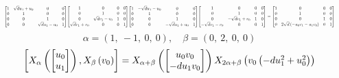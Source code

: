 \documentclass[11pt]{article}
\theoremstyle{definition}
\begin{document}
\[
\scaletoalign{\textwidth}{{\left[\begin{matrix}1 & \sqrt{d} u_{1} + u_{0} & 0 & 0\\0 & 1 & 0 & 0\\0 & 0 & 1 & 0\\0 & 0 & \sqrt{d} u_{1} - u_{0} & 1\end{matrix}\right]} {\left[\begin{matrix}1 & 0 & 0 & 0\\0 & 1 & 0 & 0\\0 & \sqrt{d} v_{1} - v_{0} & 1 & 0\\\sqrt{d} v_{1} + v_{0} & 0 & 0 & 1\end{matrix}\right]} {\left[\begin{matrix}1 & - \sqrt{d} u_{1} - u_{0} & 0 & 0\\0 & 1 & 0 & 0\\0 & 0 & 1 & 0\\0 & 0 & - \sqrt{d} u_{1} + u_{0} & 1\end{matrix}\right]} {\left[\begin{matrix}1 & 0 & 0 & 0\\0 & 1 & 0 & 0\\0 & - \sqrt{d} v_{1} + v_{0} & 1 & 0\\- \sqrt{d} v_{1} - v_{0} & 0 & 0 & 1\end{matrix}\right]} = {\left[\begin{matrix}1 & 0 & 0 & 0\\0 & 1 & 0 & 0\\0 & 0 & 1 & 0\\0 & 2 \sqrt{d} \left(- u_{0} v_{1} - u_{1} v_{0}\right) & 0 & 1\end{matrix}\right]}}
\]
\[
\alpha = \left( 1, \  -1, \  0, \  0\right), \quad \beta = \left( 0, \  2, \  0, \  0\right)
\]
\[
\scaletoalign{\textwidth}{\left[ X_{\alpha}\left(\left[\begin{matrix}u_{0}\\u_{1}\end{matrix}\right]\right), X_{\beta}\left(v_{0}\right) \right] = X_{\alpha + \beta}\left(\left[\begin{matrix}u_{0} v_{0}\\- d u_{1} v_{0}\end{matrix}\right]\right) X_{2\alpha + \beta}\left(v_{0} \left(- d u_{1}^{2} + u_{0}^{2}\right)\right)}
\]
\end{document}
